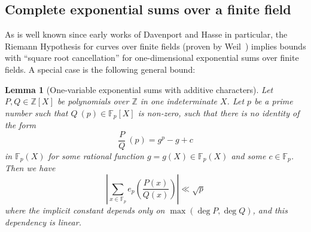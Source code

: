 \documentclass[12pt,a4paper,reqno]{amsart}
\numberwithin{equation}{section}
\theoremstyle{plain}
\newtheorem{lemma}[theorem]{Lemma}
\theoremstyle{definition}
\newcommand\F{\mathbb{F}}
\newcommand\Z{\mathbb{Z}}
\newcommand\Fp{\F_{p}}
\begin{document}

\subsection{Complete exponential sums over a finite field}

As is well known since early works of Davenport and Hasse in
particular, the Riemann Hypothesis for curves over finite fields
(proven by Weil~\cite{weilrh}) implies bounds with ``square root
cancellation'' for one-dimensional exponential sums over finite
fields.  A special case is the following general bound:

\begin{lemma}[One-variable exponential sums with additive
  characters]\label{prime-exp} Let $P, Q \in
  \Z[X]$ be polynomials over $\Z$ in one indeterminate $X$. Let $p$ be
  a prime number such that $Q\ (p) \in \F_p[X]$ is non-zero, such that
  there is no identity of the form
\begin{equation}\label{Degenerate}
  \frac{P}{Q}\ (p) = g^p - g + c
\end{equation}
in $\F_p(X)$ for some rational function $g = g(X)\in\Fp(X)$ and some
$c \in \F_p$.  Then we have
\begin{equation}\label{pqp}
  \left|\sum_{x \in \F_p} e_p\left(\frac{P(x)}{Q(x)}\right)\right| \ll \sqrt{p}
\end{equation}
where the implicit constant depends only on $\max(\deg P, \deg Q)$,
and this dependency is linear.
\end{lemma}
\end{document}
